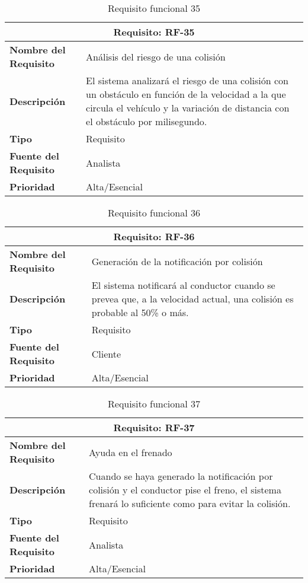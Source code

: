 \begin{table}[H]
\begin{center}
\begin{tabular}{p{} p{7cm}}
\multicolumn{2}{c}{\textbf{Requisito: RF-35} } \\
\hline \hline
\textbf{Nombre del Requisito} & Análisis del riesgo de una colisión\\
\hline
\textbf{Descripción} &  El sistema analizará el riesgo de una colisión con un obstáculo en función de la velocidad a la que circula el vehículo y la variación de distancia con el obstáculo por milisegundo.\\
\hline
\textbf{Tipo} & Requisito  \\
\hline
\textbf{Fuente del Requisito} & Analista  \\
\hline
\textbf{Prioridad} & Alta/Esencial \\ \hline
\end{tabular}
\caption{Requisito funcional 35}
\label{tab:RF-35}
\end{center}
\end{table}

\begin{table}[H]
\begin{center}
\begin{tabular}{p{} p{7cm}}
\multicolumn{2}{c}{\textbf{Requisito: RF-36} } \\
\hline \hline
\textbf{Nombre del Requisito} & Generación de la notificación por colisión\\
\hline
\textbf{Descripción} &  El sistema notificará al conductor cuando se prevea que, a la velocidad actual, una colisión es probable al 50\% o más.\\
\hline
\textbf{Tipo} & Requisito  \\
\hline
\textbf{Fuente del Requisito} & Cliente  \\
\hline
\textbf{Prioridad} & Alta/Esencial \\ \hline
\end{tabular}
\caption{Requisito funcional 36}
\label{tab:RF-36}
\end{center}
\end{table}

\begin{table}[H]
\begin{center}
\begin{tabular}{p{} p{7cm}}
\multicolumn{2}{c}{\textbf{Requisito: RF-37} } \\
\hline \hline
\textbf{Nombre del Requisito} & Ayuda en el frenado\\
\hline
\textbf{Descripción} & Cuando se haya generado la notificación por colisión y el conductor pise el freno, el sistema frenará lo suficiente como para evitar la colisión. \\
\hline
\textbf{Tipo} & Requisito  \\
\hline
\textbf{Fuente del Requisito} & Analista  \\
\hline
\textbf{Prioridad} & Alta/Esencial \\ \hline
\end{tabular}
\caption{Requisito funcional 37}
\label{tab:RF-37}
\end{center}
\end{table}

